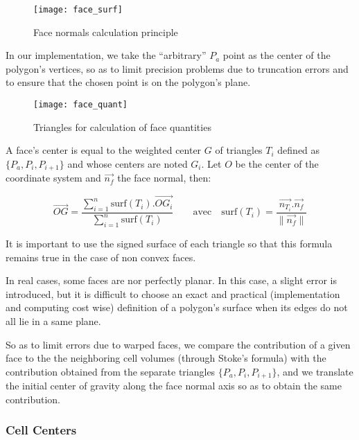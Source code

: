 \begin{figure}[!h]
\centerline{
\texttt{[image: face\_surf]}}
\caption{Face normals calculation principle}
\label{fig:algo.norm_fac.principle}
\end{figure}

In our implementation, we take the ``arbitrary'' $P_a$ point as
the center of the polygon's vertices, so as to limit
precision problems due to truncation errors and to ensure that
the chosen point is on the polygon's plane.

\begin{figure}[!h]
\centerline{
\texttt{[image: face\_quant]}}
\caption{Triangles for calculation of face quantities}
\label{fig:algo.grd_fac.triangles}
\end{figure}

A face's center is equal to the weighted center $G$ of triangles
$T_i$ defined as $\{P_a, P_i, P_{i+1}\}$ and whose centers are
noted $G_i$. Let $O$ be the center of the coordinate system and
$\overrightarrow{n_f}$ the face normal, then:

\begin{displaymath}
\overrightarrow{OG}
= \frac{\sum_{i=1}^n \textrm{surf}(T_i).\overrightarrow{OG_i}}
       {\sum_{i=1}^n \textrm{surf}(T_i)}
\qquad \textrm {avec} \quad
\textrm{surf}(T_i) = \frac{\overrightarrow{n_{T_i}}.\overrightarrow{n_f}}
                          {\parallel \overrightarrow{n_f} \parallel}
\end{displaymath}

It is important to use the signed surface of each triangle so
that this formula remains true in the case of non convex faces.

In real cases, some faces are nor perfectly planar. In this case,
a slight error is introduced, but it is difficult to choose an exact
and practical (implementation and computing cost wise) definition of a
polygon's surface when its edges do not all lie in a same plane.

So as to limit errors due to warped faces, we compare the contribution
of a given face to the the neighboring cell volumes (through
Stoke's formula) with the contribution obtained from the separate
triangles $\{P_a, P_i, P_{i+1}\}$, and we translate the initial center
of gravity along the face normal axis so as to obtain the same contribution.

\subsubsection{Cell Centers%
               \label{sec:geo_quant.cdgcel}}

